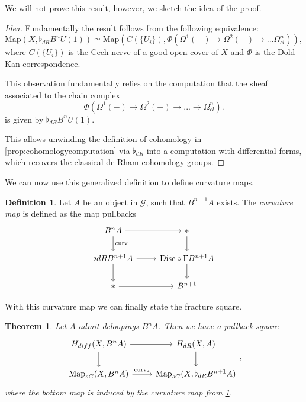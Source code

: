 \documentclass[a4paper]{book}
\newcommand{\lG}{\mathcal{G}}
\newtheorem{theorem}[equation]{Theorem}
\theoremstyle{definition}
\newtheorem{definition}[equation]{Definition}
\theoremstyle{remark}
\numberwithin{equation}{section}
\begin{document}
We will not prove this result, however, we	sketch the idea of the proof.
\begin{proof}[Idea]
	 Fundamentally the result follows from the following equivalence:
	\[\mathrm{Map}(X, \flat_{dR} B^n	U(1)) \simeq \mathrm{Map}(C(\{U_i\}), \Phi(\Omega^1(-) \to \Omega^2(-) \to ... \Omega^n_{cl})), \]
	where $C(\{U_i\})$ is the Cech nerve of a good open cover of $X$ and $\Phi$ is the Dold-Kan correspondence.

	This observation fundamentally relies on the computation that the sheaf associated to the chain complex
\[	\Phi(\Omega^1(-) \to \Omega^2(-) \to ...	\to \Omega^n_{cl}). \] 
 is given by $\flat_{dR} B^n	U(1)$.

	This allows unwinding the definition of cohomology in \cref{prop:cohomologycomputation} via $\flat_{dR}$ into a computation with differential forms, which recovers the classical de Rham cohomology groups.
\end{proof}


We can now use this generalized definition to define curvature maps.

\begin{definition} \label{def:curvaturemap}
	Let $A$ be an object in $\lG$, such that $B^{n+1} A$ exists. The \emph{curvature map} is	defined as the map pullbacks
	\[ 
	\begin{tikzcd}
		B^nA \arrow[r] \arrow[d, "\mathrm{curv}"] & * \arrow[d]  \\
		\flat{dR} B^{n+1} A \arrow[r]  \arrow[d] & \mathrm{Disc} \circ \Gamma  B^{n+1} A \arrow[d] \\ 
		* \arrow[r] & B^{n+1} 
	\end{tikzcd}
	\]
\end{definition}

With this curvature map we can finally state the fracture square.
\begin{theorem}
	Let $A$ admit deloopings $B^n A$. Then we have a pullback square
	\[ 
		\begin{tikzcd}
			H_{diff}(X,B^nA) \arrow[r] \arrow[d] & H_{dR}(X,A) \arrow[d]  \\ 
			\mathrm{Map}_{sG}(X,B^nA) \arrow[r, "\mathrm{curv}_*"] & \mathrm{Map}_{sG}(X, \flat_{dR} B^{n+1} A)
		\end{tikzcd},
		\]
		where the bottom map is induced by the curvature map from \cref{def:curvaturemap}.
	\end{theorem}
\end{document}
